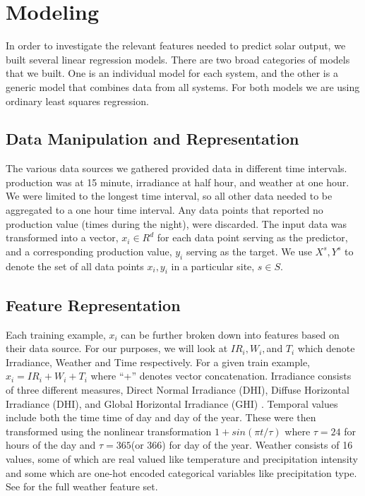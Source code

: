 \documentclass[11pt, fullpage,letterpaper]{article}
\begin{document}
\section{Modeling}

In order to investigate the relevant features needed to predict solar output, we built several linear regression models. There are two broad categories of models that we built. One is an individual model for each system, and the other is a generic model that combines data from all systems. For both models we are using ordinary least squares regression. 

\subsection{Data Manipulation and Representation}

The various data sources we gathered provided data in different time intervals. production was at 15 minute, irradiance at half hour, and weather at one hour. We were limited to the longest time interval, so all other data needed to be aggregated to a one hour time interval. Any data points that reported no production value (times during the night), were discarded. The input data was transformed into a vector, $x_i \in R^d$ for each data point serving as the predictor, and a corresponding production value, $y_i$ serving as the target. We use $X^s, Y^s$ to denote the set of all data points $x_i,y_i$ in a particular site, $s \in S$.

\subsection{Feature Representation}

Each training example, $x_i$ can be further broken down into features based on their data source. For our purposes, we will look at $IR_i,W_i,$and $T_i$ which denote Irradiance, Weather and Time respectively. For a given train example, $x_i=IR_i+W_i+T_i$ where ``+'' denotes vector concatenation. Irradiance consists of three different measures, Direct Normal Irradiance (DHI), Diffuse Horizontal Irradiance (DHI), and Global Horizontal Irradiance (GHI) \cite{irradiance}. Temporal values include both the time time of day and day of the year. These were then transformed using the nonlinear transformation $1 + sin( \pi t / \tau )$ where $\tau=24$ for hours of the day and $\tau=365$(or $366$) for day of the year. Weather consists of 16 values, some of which are real valued like temperature and precipitation intensity and some which are one-hot encoded categorical variables like precipitation type. See \cite{DarkSky} for the full weather feature set.
\end{document}
